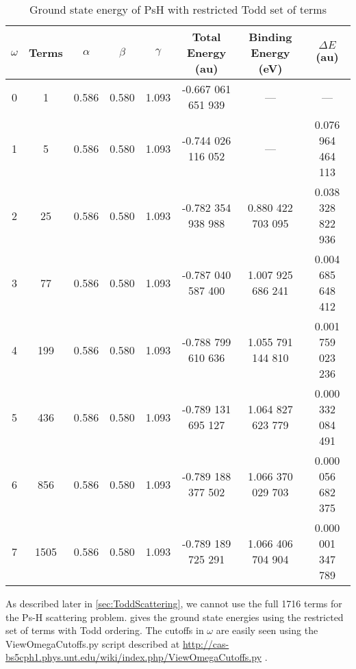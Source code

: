 \documentclass[Dissertation.tex]{subfiles}
\begin{document}
\setlength{\abovecaptionskip}{6pt}   %
\setlength{\belowcaptionskip}{6pt}   %
\begin{table}[H]
\small
\centering
\begin{tabular}{c c c c c c c c}
\toprule
$\omega$ & Terms & $\alpha$ & $\beta$ & $\gamma$ & Total Energy (au) & Binding Energy (eV) & $\Delta E$ (au) \\ [0.5ex]
\midrule
0 & 1    & 0.586 & 0.580 & 1.093 & -0.667 061 651 939 & --- & --- \\
1 & 5    & 0.586 & 0.580 & 1.093 & -0.744 026 116 052 & ---               & 0.076 964 464 113 \\
2 & 25   & 0.586 & 0.580 & 1.093 & -0.782 354 938 988 & 0.880 422 703 095 & 0.038 328 822 936 \\
3 & 77   & 0.586 & 0.580 & 1.093 & -0.787 040 587 400 & 1.007 925 686 241 & 0.004 685 648 412 \\
4 & 199  & 0.586 & 0.580 & 1.093 & -0.788 799 610 636 & 1.055 791 144 810 & 0.001 759 023 236 \\
5 & 436  & 0.586 & 0.580 & 1.093 & -0.789 131 695 127 & 1.064 827 623 779 & 0.000 332 084 491 \\
6 & 856  & 0.586 & 0.580 & 1.093 & -0.789 188 377 502 & 1.066 370 029 703 & 0.000 056 682 375 \\
7 & 1505 & 0.586 & 0.580 & 1.093 & -0.789 189 725 291 & 1.066 406 704 904 & 0.000 001 347 789 \\
\bottomrule
\end{tabular}
\caption{Ground state energy of PsH with restricted Todd set of terms}
\label{tab:BoundEnergyTodd1}
\end{table}

As described later in \cref{sec:ToddScattering}, we cannot use the full 1716 terms for the Ps-H scattering problem.  gives the ground state energies using the restricted set of terms with Todd ordering. The cutoffs in $\omega$ are easily seen using the ViewOmegaCutoffs.py script described at \url{http://cas-bs5cph1.phys.unt.edu/wiki/index.php/ViewOmegaCutoffs.py} \cite{Wiki}.
\end{document}
